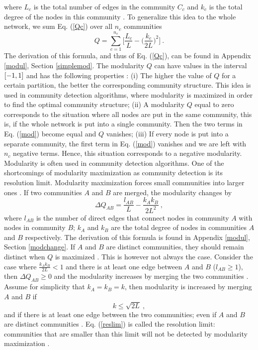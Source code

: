 \documentclass[11 pt , letterpaper , twoside , openright]{book}
\begin{document}
where $L_c$ is the total number of edges in the community $C_c$ and $k_c$ is the total degree of the nodes in this community \cite{Albert2016}. To generalize this idea to the whole network, we sum Eq. (\ref{Qc}) over all $n_c$ communities \cite{Albert2016}
\begin{equation}\label{mod}
	Q = \sum_{c = 1}^{n_c}\bigg[\frac{L_c}{L} - \bigg(\frac{k_c}{2L}\bigg)^2 \bigg] \ .
\end{equation}
The derivation of this formula, and thus of Eq. (\ref{Qc}), can be found in Appendix \ref{modul}, Section \ref{simplemod}. The modularity $Q$ can have values in the interval $\interval{-1}{1}$ and has the following properties \cite{Albert2016}: (i) The higher the value of $Q$ for a certain partition, the better the corresponding community structure. This idea is used in community detection algorithms, where modularity is maximized in order to find the optimal community structure; (ii) A modularity $Q$ equal to zero corresponds to the situation where all nodes are put in the same community, this is, if the whole network is put into a single community. Then the two terms in Eq. (\ref{mod}) become equal and $Q$ vanishes; (iii) If every node is put into a separate community, the first term in Eq. (\ref{mod}) vanishes and we are left with $n_c$ negative terms. Hence, this situation corresponds to a negative modularity.\\
\newline
Modularity is often used in community detection algorithms. One of the shortcomings of modularity maximization as community detection is its resolution limit. Modularity maximization forces small communities into larger ones \cite{Albert2016}. If two communities $A$ and $B$ are merged, the modularity changes by \cite{Albert2016}
\begin{equation}
	\Delta Q_{AB} = \frac{l_{AB}}{L} - \frac{k_Ak_B}{2L^2} \ ,
\end{equation}
where $l_{AB}$ is the number of direct edges that connect nodes in community $A$ with nodes in community $B$; $k_A$ and $k_B$ are the total degree of nodes in communities $A$ and $B$ respectively. The derivation of this formula is found in Appendix \ref{modul}, Section \ref{modchange}. If $A$ and $B$ are distinct communities, they should remain distinct when $Q$ is maximized \cite{Albert2016}. This is however not always the case. Consider the case where $\frac{k_Ak_B}{2L} < 1$ and there is at least one edge between $A$ and $B$ ($l_{AB} \geqslant 1$), then $\Delta Q_{AB} \geqslant 0$ and the modularity increases by merging the two communities \cite{Albert2016}. Assume for simplicity that $k_A = k_B = k$, then modularity is increased by merging $A$ and $B$ if
\begin{equation}\label{reslim}
	k \leqslant \sqrt{2L} \ ,
\end{equation}
and if there is at least one edge between the two communities; even if $A$ and $B$ are distinct communities \cite{Albert2016}. Eq. (\ref{reslim}) is called the resolution limit: communities that are smaller than this limit will not be detected by modularity maximization \cite{Albert2016}.
\end{document}

